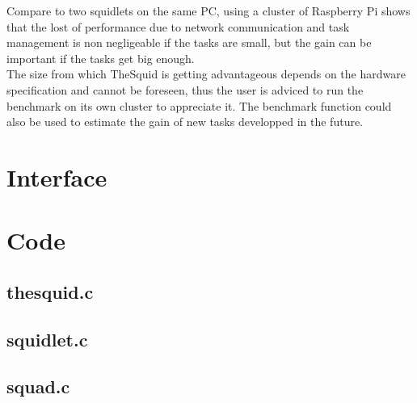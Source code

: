 Compare to two squidlets on the same PC, using a cluster of Raspberry Pi shows that the lost of performance due to network communication and task management is non negligeable if the tasks are small, but the gain can be important if the tasks get big enough.\\

The size from which TheSquid is getting advantageous depends on the hardware specification and cannot be foreseen, thus the user is adviced to run the benchmark on its own cluster to appreciate it. The benchmark function could also be used to estimate the gain of new tasks developped in the future.\\ 

\section{Interface}

\begin{scriptsize}
\begin{ttfamily}

\end{ttfamily}
\end{scriptsize}

\section{Code}

\subsection{thesquid.c}

\begin{scriptsize}
\begin{ttfamily}

\end{ttfamily}
\end{scriptsize}

\subsection{squidlet.c}

\begin{scriptsize}
\begin{ttfamily}

\end{ttfamily}
\end{scriptsize}

\subsection{squad.c}

